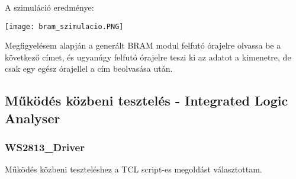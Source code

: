 \documentclass[10pt]{article} %
\begin{document}
A szimuláció eredménye:

\texttt{[image: bram\_szimulacio.PNG]}

Megfigyelésem alapján a generált BRAM modul felfutó órajelre olvassa be a következő címet, és ugyanúgy felfutó órajelre teszi ki az adatot a kimenetre, de csak egy egész órajellel a cím beolvasása után.

\subsection{Működés közbeni tesztelés - Integrated Logic Analyser}

\subsubsection{WS2813\_Driver}

Működés közbeni teszteléshez a TCL script-es megoldást választottam.
\end{document}
